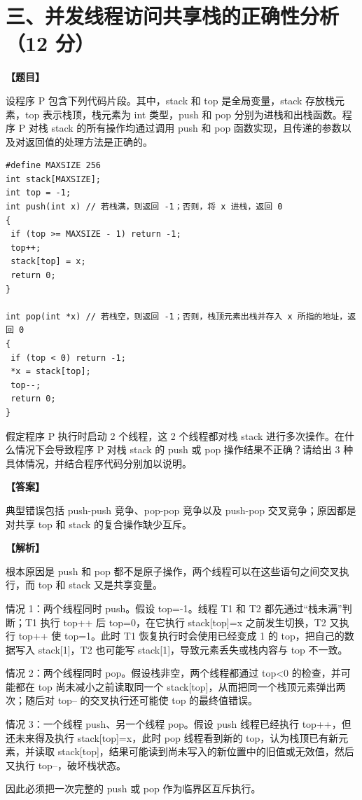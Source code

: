 \documentclass[UTF8,12pt]{ctexart}
\newenvironment{question}{\par\medskip\noindent\textbf{【题目】}\par\smallskip}{\par\medskip}
\newenvironment{explanation}{\par\noindent\textbf{【解析】}\par\smallskip}{\par\medskip}
\newenvironment{answer}{\par\noindent\textbf{【答案】}\par\smallskip}{\par}
\begin{document}
\section*{三、并发线程访问共享栈的正确性分析（12 分）}
\begin{question}
设程序 P 包含下列代码片段。其中，stack 和 top 是全局变量，stack 存放栈元素，top 表示栈顶，栈元素为 int 类型，push 和 pop 分别为进栈和出栈函数。程序 P 对栈 stack 的所有操作均通过调用 push 和 pop 函数实现，且传递的参数以及对返回值的处理方法是正确的。

\begin{lstlisting}
#define MAXSIZE 256
int stack[MAXSIZE];
int top = -1;
int push(int x) // 若栈满，则返回 -1；否则，将 x 进栈，返回 0
{
 if (top >= MAXSIZE - 1) return -1;
 top++;
 stack[top] = x;
 return 0;
}

int pop(int *x) // 若栈空，则返回 -1；否则，栈顶元素出栈并存入 x 所指的地址，返回 0
{
 if (top < 0) return -1;
 *x = stack[top];
 top--;
 return 0;
}
\end{lstlisting}

假定程序 P 执行时启动 2 个线程，这 2 个线程都对栈 stack 进行多次操作。在什么情况下会导致程序 P 对栈 stack 的 push 或 pop 操作结果不正确？请给出 3 种具体情况，并结合程序代码分别加以说明。
\end{question}

\begin{answer}
典型错误包括 push-push 竞争、pop-pop 竞争以及 push-pop 交叉竞争；原因都是对共享 top 和 stack 的复合操作缺少互斥。
\end{answer}

\begin{explanation}
根本原因是 push 和 pop 都不是原子操作，两个线程可以在这些语句之间交叉执行，而 top 和 stack 又是共享变量。

情况 1：两个线程同时 push。假设 top=-1。线程 T1 和 T2 都先通过“栈未满”判断；T1 执行 top++ 后 top=0，在它执行 stack[top]=x 之前发生切换，T2 又执行 top++ 使 top=1。此时 T1 恢复执行时会使用已经变成 1 的 top，把自己的数据写入 stack[1]，T2 也可能写 stack[1]，导致元素丢失或栈内容与 top 不一致。

情况 2：两个线程同时 pop。假设栈非空，两个线程都通过 top<0 的检查，并可能都在 top 尚未减小之前读取同一个 stack[top]，从而把同一个栈顶元素弹出两次；随后对 top-- 的交叉执行还可能使 top 的最终值错误。

情况 3：一个线程 push、另一个线程 pop。假设 push 线程已经执行 top++，但还未来得及执行 stack[top]=x，此时 pop 线程看到新的 top，认为栈顶已有新元素，并读取 stack[top]，结果可能读到尚未写入的新位置中的旧值或无效值，然后又执行 top--，破坏栈状态。

因此必须把一次完整的 push 或 pop 作为临界区互斥执行。
\end{explanation}
\end{document}
